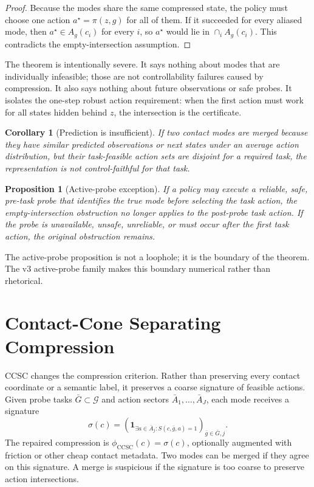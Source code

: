 \documentclass{article}
\newtheorem{corollary}{Corollary}
\newtheorem{proposition}{Proposition}
\newcommand{\tasks}{\mathcal{G}}
\newcommand{\compress}{\phi}
\newcommand{\ccsc}{\mathrm{CCSC}}
\begin{document}
\begin{proof}
Because the modes share the same compressed state, the policy must choose one action $a^\star=\pi(z,g)$ for all of them. If it succeeded for every aliased mode, then $a^\star\in A_g(c_i)$ for every $i$, so $a^\star$ would lie in $\cap_i A_g(c_i)$. This contradicts the empty-intersection assumption.
\end{proof}

The theorem is intentionally severe. It says nothing about modes that are individually infeasible; those are not controllability failures caused by compression. It also says nothing about future observations or safe probes. It isolates the one-step robust action requirement: when the first action must work for all states hidden behind $z$, the intersection is the certificate.

\begin{corollary}[Prediction is insufficient]
If two contact modes are merged because they have similar predicted observations or next states under an average action distribution, but their task-feasible action sets are disjoint for a required task, the representation is not control-faithful for that task.
\end{corollary}

\begin{proposition}[Active-probe exception]
If a policy may execute a reliable, safe, pre-task probe that identifies the true mode before selecting the task action, the empty-intersection obstruction no longer applies to the post-probe task action. If the probe is unavailable, unsafe, unreliable, or must occur after the first task action, the original obstruction remains.
\end{proposition}

The active-probe proposition is not a loophole; it is the boundary of the theorem. The v3 active-probe family makes this boundary numerical rather than rhetorical.

\section{Contact-Cone Separating Compression}
CCSC changes the compression criterion. Rather than preserving every contact coordinate or a semantic label, it preserves a coarse signature of feasible actions. Given probe tasks $\bar G\subset \tasks$ and action sectors $\bar A_1,\ldots,\bar A_J$, each mode receives a signature
\[
\sigma(c)=\left(\mathbf{1}_{\exists a\in \bar A_j:S(c,\bar g,a)=1}\right)_{\bar g\in \bar G,j}.
\]
The repaired compression is $\compress_{\ccsc}(c)=\sigma(c)$, optionally augmented with friction or other cheap contact metadata. Two modes can be merged if they agree on this signature. A merge is suspicious if the signature is too coarse to preserve action intersections.
\end{document}

